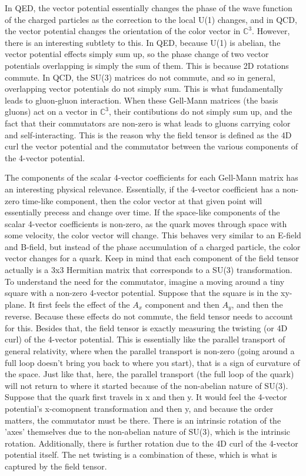 \documentclass{article}
\begin{document}
In QED, the vector potential essentially changes the phase of the wave function of the charged particles as the correction to the local U(1) changes, and in QCD, the vector potential changes the orientation of the color vector in $\mathbb{C}^3$.
However, there is an interesting subtlety to this. In QED, because U(1) is abelian, the vector potential effects simply sum up, so the phase change of two vector potentials overlapping is simply the sum of them. This is because 2D rotations commute.
In QCD, the SU(3) matrices do not commute, and so in general, overlapping vector potentials do not simply sum. This is what fundamentally leads to gluon-gluon interaction. 
When these Gell-Mann matrices (the basis gluons) act on a vector in $\mathbb{C}^3$, their contibutions do not simply sum up, and the fact that their commutators are non-zero is what leads to gluons carrying color and self-interacting.
This is the reason why the field tensor is defined as the 4D curl the vector potential and the commutator between the various components of the 4-vector potential. \newline

The components of the scalar 4-vector coefficients for each Gell-Mann matrix has an interesting physical relevance. Essentially, if the 4-vector coefficient has a non-zero time-like component, then the color vector at that given point will essentially precess and change over time.
If the space-like components of the scalar 4-vector coefficients is non-zero, as the quark moves through space with some velocity, the color vector will change.
This behaves very similar to an E-field and B-field, but instead of the phase accumulation of a charged particle, the color vector changes for a quark.
Keep in mind that each component of the field tensor actually is a 3x3 Hermitian matrix that corresponds to a SU(3) transformation. To understand the need for the commutator, imagine a moving around a tiny square with a non-zero 4-vector potential.
Suppose that the square is in the xy-plane.
 It first feels the effect of the $A_x$ component and then $A_y$, and then the reverse. 
 Because these effects do not commute, the field tensor needs to account for this.
Besides that, the field tensor is exactly measuring the twisting (or 4D curl) of the 4-vector potential. This is essentially like the parallel transport of general relativity, where when the parallel transport is non-zero (going around a full loop doesn't bring you back to where you start), that is a sign of curvature of the space. 
Just like that, here, the parallel transport (the full loop of the quark) will not return to where it started because of the non-abelian nature of SU(3).
Suppose that the quark first travels in x and then y. It would feel the 4-vector potential's x-comopnent transformation and then y, and because the order matters, the commutator must be there.
There is an intrinsic rotation of the 'axes' themselves due to the non-abelian nature of SU(3), which is the intrinsic rotation. Additionally, there is further rotation due to the 4D curl of the 4-vector potential itself. The net twisting is a combination of these, which is what is captured by the field tensor. \newline
\end{document}
